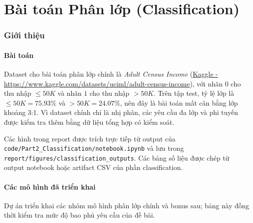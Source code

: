 \documentclass[12pt,a4paper]{article}
\newcommand{\adult}{\textit{Adult Census Income }}
\newcommand{\codepath}[1]{\begingroup\small\ttfamily\nolinkurl{#1}\endgroup}
\let\oldpart\part
\renewcommand{\part}{%
  \setcounter{section}{0}%
  \setcounter{subsection}{0}%
  \oldpart
}
\begin{document}
\newpage
\part{Bài toán Phân lớp (Classification)}

\section{Giới thiệu}
\label{sec:cls_intro}

\subsection{Bài toán}

Dataset cho bài toán phân lớp chính là \adult (\url{Kaggle - https://www.kaggle.com/datasets/uciml/adult-census-income}), với nhãn $0$ cho thu nhập $\leq 50K$ và nhãn $1$ cho thu nhập $>50K$. Trên tập test, tỷ lệ lớp là $\leq 50K=75.93\%$ và $>50K=24.07\%$, nên đây là bài toán mất cân bằng lớp khoảng 3:1. Vì dataset chính chỉ là nhị phân, các yêu cầu đa lớp và phi tuyến được kiểm tra thêm bằng dữ liệu tổng hợp có kiểm soát.

Các hình trong report được trích trực tiếp từ output của \codepath{code/Part2_Classification/notebook.ipynb} và lưu trong \codepath{report/figures/classification_outputs}. Các bảng số liệu được chép từ output notebook hoặc artifact CSV của phần classification.

\subsection{Các mô hình đã triển khai}

Dự án triển khai các nhóm mô hình phân lớp chính và bonus sau; bảng này đồng thời kiểm tra mức độ bao phủ yêu cầu của đề bài.
\end{document}
